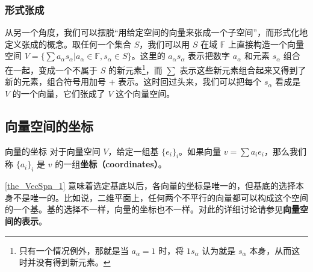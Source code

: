 \subsubsection{形式张成}

从另一个角度，我们可以摆脱“用给定空间的向量来张成一个子空间”，而形式化地定义张成的概念。取任何一个集合 $S$，我们可以用 $S$ 在域 $\mathbb{F}$ 上直接构造一个向量空间 $V=\{\sum a_\alpha s_\alpha|a_\alpha\in\mathbb{F}, s_\alpha\in S\}$。这里的 $a_\alpha s_\alpha$ 表示把数字 $a_\alpha$ 和元素 $s_\alpha$ 组合在一起，变成一个不属于 $S$ 的新元素\footnote{只有一个情况例外，那就是当 $a_\alpha=1$ 时，将 $1s_\alpha$ 认为就是 $s_\alpha$ 本身，从而这时并没有得到新元素。}，而 $\sum$ 表示这些新元素组合起来又得到了新的元素，组合符号用加号 $+$ 表示。这时回过头来，我们可以把每个 $s_\alpha$ 看成是 $V$ 的一个向量，它们张成了 $V$ 这个向量空间。


\subsection{向量空间的坐标}



\begin{definition}{向量的坐标}
对于向量空间 $V$，给定一组基 $\{e_i\}_i$。如果向量 $v=\sum a_i e_i$，那么我们称 $\{a_i\}_i$ 是 $v$ 的一组\textbf{坐标（coordinates）}。
\end{definition}

\autoref{the_VecSpn_1} 意味着选定基底以后，各向量的坐标是唯一的，但基底的选择本身不是唯一的。比如说，二维平面上，任何两个不平行的向量都可以构成这个空间的一个基。基的选择不一样，向量的坐标也不一样。对此的详细讨论请参见\textbf{向量空间的表示}。







% 


